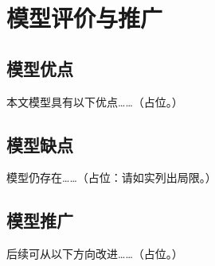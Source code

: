 \section{模型评价与推广}

\subsection{模型优点}
本文模型具有以下优点……（占位。）

\subsection{模型缺点}
模型仍存在……（占位：请如实列出局限。）

\subsection{模型推广}
后续可从以下方向改进……（占位。）
